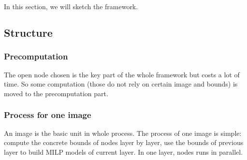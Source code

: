 \documentclass{llncs}
\begin{document}

In this section, we will sketch the framework. 

\subsection{Structure}

\subsubsection*{Precomputation}

The open node chosen is the key part of the whole framework but costs a lot of time. So some computation (those do not rely on certain image and bounds) is moved to the precomputation part.

%



\subsubsection*{Process for one image} An image is the basic unit in whole process. The process of one image is simple: compute the concrete bounds of nodes layer by layer, use the bounds of previous layer to build MILP models of current layer. In one layer, nodes runs in parallel.


\end{document}
